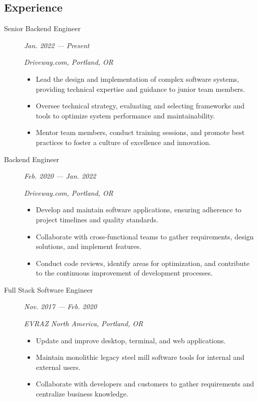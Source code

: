 \documentclass{article}
\def \intraspace {0.1em}
\begin{document}

\subsection*{Experience}

    \begin{description}
		
	\item[Senior Backend Engineer] \hfill \textit{Jan. 2022 — Present}
	
        \textit{Driveway.com, Portland, OR}
		\begin{itemize}
    	\item Lead the design and implementation of complex software systems, providing technical expertise and guidance to junior team members.
    	\item Oversee technical strategy, evaluating and selecting frameworks and tools to optimize system performance and maintainability.
    	\item Mentor team members, conduct training sessions, and promote best practices to foster a culture of excellence and innovation.	
		\end{itemize}
		\vspace{\intraspace}
	
	\item[Backend Engineer] \hfill \textit{Feb. 2020 — Jan. 2022}
		
        \textit{Driveway.com, Portland, OR}
        \begin{itemize}
		\item Develop and maintain software applications, ensuring adherence to project timelines and quality standards.
    	\item Collaborate with cross-functional teams to gather requirements, design solutions, and implement features.
    	\item Conduct code reviews, identify areas for optimization, and contribute to the continuous improvement of development processes.
        \end{itemize}
		\vspace{\intraspace}

	\item[Full Stack Software Engineer] \hfill \textit{Nov. 2017 — Feb. 2020}
		
        \textit{EVRAZ North America, Portland, OR}
        \begin{itemize}     
            \item Update and improve desktop, terminal, and web applications.
            \item Maintain monolithic legacy steel mill software tools for internal and external users.
            \item Collaborate with developers and customers to gather requirements and centralize business knowledge.
        \end{itemize}
        
    \end{description}
\end{document}
